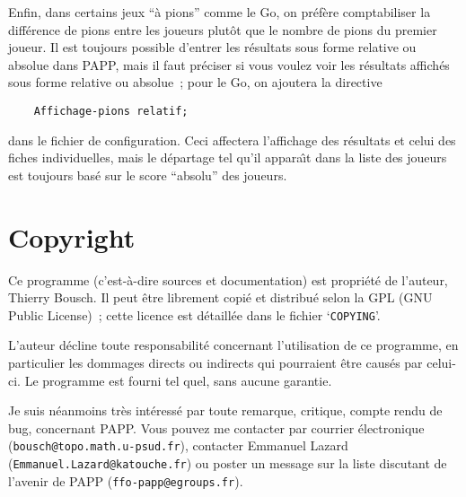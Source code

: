 \documentclass[10pt]{article}
\begin{document}
	Enfin, dans certains jeux ``\`a pions'' comme le Go, on pr\'ef\`ere
comptabiliser la diff\'erence de pions entre les joueurs plut\^ot que le
nombre de pions du premier joueur. Il est toujours possible d'entrer les
r\'esultats sous forme relative ou absolue dans PAPP, mais il faut
pr\'eciser si vous voulez voir les r\'esultats affich\'es sous forme
relative ou absolue~; pour le Go, on ajoutera la directive
\begin{verbatim}
    Affichage-pions relatif;
\end{verbatim}
dans le fichier de configuration. Ceci affectera l'affichage des
r\'esultats et celui des fiches individuelles, mais le d\'epartage tel
qu'il appara{\^\i}t dans la liste des joueurs est toujours bas\'e sur le
score ``absolu'' des joueurs.

\section{Copyright}

	Ce programme (c'est-\`a-dire sources et documentation) est
propri\'et\'e de l'auteur, Thierry Bousch. Il peut \^etre librement
copi\'e et distribu\'e selon la GPL (GNU Public License)~; cette licence
est d\'etaill\'ee dans le fichier `\verb|COPYING|'.

	L'auteur d\'ecline toute responsabilit\'e concernant
l'utilisation de ce programme, en particulier les dommages directs ou
indirects qui pourraient \^etre caus\'es par celui-ci.  Le programme est
fourni tel quel, sans aucune garantie.

Je suis n\'eanmoins tr\`es int\'eress\'e par toute remarque, critique, 
compte rendu de bug, concernant PAPP. Vous pouvez me contacter par 
courrier \'electronique
(\verb|bousch@topo.math.u-psud.fr|), contacter Emmanuel Lazard (\verb|Emmanuel.Lazard@katouche.fr|) ou poster un message sur la liste 
discutant de l'avenir de PAPP (\verb|ffo-papp@egroups.fr|).

\newpage
\tableofcontents
\end{document}
